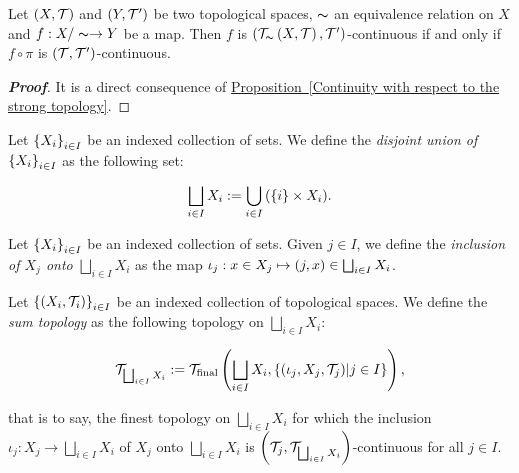 \begin{corollary}
  Let $\left(X,\mathcal{T}\right)$ and $\left(Y,\mathcal{T}'\right)$ be two topological spaces, $\thicksim$ an equivalence relation on $X$ and $f:X/\thicksim\rightarrow Y$ be a map. Then $f$ is $\left(\mathcal{T}_{\thicksim}\left(X,\mathcal{T}\right),\mathcal{T}'\right)$-continuous if and only if $f\circ\pi$ is $\left(\mathcal{T},\mathcal{T}'\right)$-continuous.

  \begin{proof}[\rm\textbf{Proof}]
    It is a direct consequence of \hyperref[Continuity with respect to the strong topology]{Proposition~\ref*{Continuity with respect to the strong topology}}.
  \end{proof}
\end{corollary}

\begin{definition}
  Let $\left\{X_i\right\}_{i\in I}$ be an indexed collection of sets. We define the \textit{disjoint union of $\left\{X_i\right\}_{i\in I}$} as the following set:

  \begin{equation}
    \bigsqcup_{i\in I}{X_i}:=\bigcup_{i\in I}{\left(\left\{i\right\}\times X_i\right)}.
  \end{equation}
\end{definition}

\begin{definition}
  Let $\left\{X_i\right\}_{i\in I}$ be an indexed collection of sets. Given $j\in I$, we define the \textit{inclusion of $X_j$ onto $\bigsqcup_{i\in I}{X_i}$} as the map $\iota_j:x\in X_j\mapsto\left(j,x\right)\in\bigsqcup_{i\in I}{X_i}$.
\end{definition}

\begin{definition}
  \rm Let $\left\{\left(X_i,\mathcal{T}_i\right)\right\}_{i\in I}$ be an indexed collection of topological spaces. We define the \textit{sum topology} as the following topology on $\bigsqcup_{i\in I}{X_i}$:

  \begin{equation}
    \mathcal{T}_{\bigsqcup_{i\in I}{X_i}}:=\mathcal{T}_{\text{final}}\left(\bigsqcup_{i\in I}{X_i},\left\{\left(\iota_j,X_j,\mathcal{T}_j\right)\middle|j\in I\right\}\right),
  \end{equation}
  

  that is to say, the finest topology on $\bigsqcup_{i\in I}{X_i}$ for which the inclusion $\iota_j:X_j\rightarrow\bigsqcup_{i\in I}{X_i}$ of $X_j$ onto $\bigsqcup_{i\in I}{X_i}$ is $\left(\mathcal{T}_j,\mathcal{T}_{\bigsqcup_{i\in I}{X_i}}\right)$-continuous for all $j\in I$.
\end{definition}

